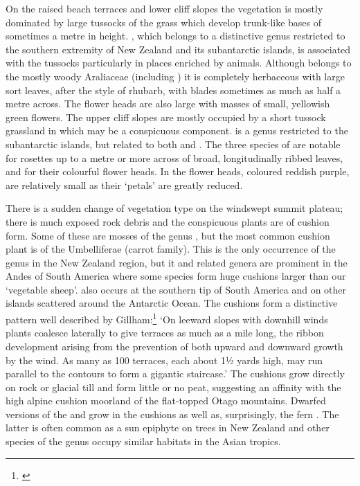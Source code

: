 On the raised beach terraces and lower cliff slopes the vegetation is mostly dominated by large tussocks of the grass  which develop trunk-like bases of sometimes a metre in height. , which belongs to a distinctive genus restricted to the southern extremity of New Zealand and its subantarctic islands, is associated with the tussocks particularly in places enriched by animals.
Although  belongs to the mostly woody Araliaceae (including ) it is completely herbaceous with large sort leaves, after the style of rhubarb, with blades sometimes as much as half a metre across.
The flower heads are also large with masses of small, yellowish green flowers.
The upper cliff slopes are mostly occupied by a short tussock grassland in which  may be a conspicuous component.  is a genus restricted to the subantarctic islands, but related to both  and .
The three species of  are notable for rosettes up to a metre or more across of broad, longitudinally ribbed leaves, and for their colourful flower heads.
In  the flower heads, coloured reddish purple, are relatively small as their `petals' are greatly reduced.

There is a sudden change of vegetation type on the windswept summit plateau; there is much exposed rock debris and the conspicuous plants are of cushion form.
Some of these are mosses of the genus , but the most common cushion plant is  of the Umbelliferae (carrot family).
This is the only occurrence of the genus in the New Zealand region, but it and related genera are prominent in the Andes of South America where some species form huge cushions larger than our `vegetable sheep'.  also occurs at the southern tip of South America and on other islands scattered around the Antarctic Ocean.
The  cushions form a distinctive pattern well described by Gillham:\footnote{\cite{gillham1967sub}} `On leeward slopes with downhill winds  plants coalesce laterally to give terraces as much as a mile long, the ribbon development arising from the prevention of both upward and downward growth by the wind.
As many as 100 terraces, each about 1½ yards high, may run parallel to the contours to form a gigantic staircase.' The cushions grow directly on rock or glacial till and form little or no peat, suggesting an affinity with the high alpine cushion moorland of the flat-topped Otago mountains.
Dwarfed versions of the  and  grow in the cushions as well as, surprisingly, the fern .
The latter is often common as a sun epiphyte on trees in New Zealand and other species of the genus occupy similar habitats in the Asian tropics.

